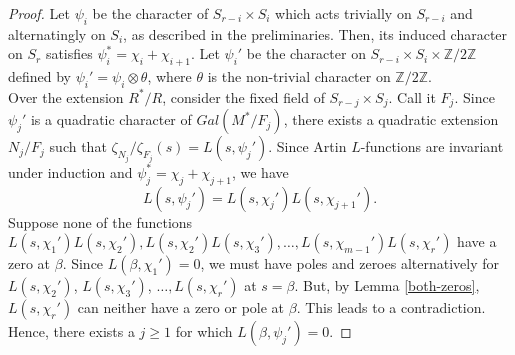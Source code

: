 \documentclass[12pt]{amsart}
\newtheorem{lemma}[theorem]{Lemma}
\theoremstyle{definition}
\newcommand{\Z}{\mathbb{Z}}
\begin{document}
\begin{proof}
    Let $\psi_i$ be the character of $S_{r-i}\times S_i$ which acts trivially on $S_{r-i}$ and alternatingly on $S_i$, as described in the preliminaries. Then, its induced character on $S_r$ satisfies $\psi_i^* = \chi_i + \chi_{i+1}$. Let $\psi_i'$ be the character on $S_{r-i}\times S_i\times \Z/2\Z$ defined by $\psi_i' = \psi_i\otimes \theta$, where $\theta$ is the non-trivial character on $\Z/2\Z$.\\
    
    Over the extension $R^*/R$, consider the fixed field of $S_{r-j}\times S_j$. Call it $F_j$. Since $\psi_j'$ is a quadratic character of $Gal(M^*/F_j)$, there exists a quadratic extension $N_j/F_j$ such that $\zeta_{N_j}/\zeta_{F_j}(s) = L(s, \psi_j')$. Since Artin $L$-functions are invariant under induction and $\psi_j^* = \chi_j + \chi_{j+1}$, we have
    \begin{equation*}
        L(s, \psi_j') = L(s,\chi_j') L(s, \chi_{j+1}').
    \end{equation*}
    Suppose none of the functions $L(s,\chi_1')L(s,\chi_2'), L(s,\chi_2')L(s,\chi_3'), \ldots, L(s,\chi_{m-1}')L(s,\chi_r') $ have a zero at $\beta$. Since $L(\beta, \chi_1')=0$, we must have poles and zeroes alternatively for $L(s,\chi_2')$, $L(s,\chi_3')$, $\ldots, L(s,\chi_r')$ at $s=\beta$. But, by Lemma \ref{both-zeros}, $L(s,\chi_r')$ can neither have a zero or pole at $\beta$. This leads to a contradiction. Hence, there exists a $j\geq 1$ for which $L(\beta, \psi_j')=0$.
\end{proof}

    
\end{document}
